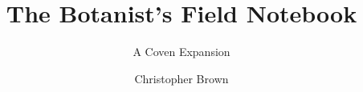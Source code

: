 \documentclass[a4paper,10pt,twocolumn]{memoir}
\title{The Botanist's Field Notebook}
\subtitle{A Coven Expansion}
\author{Christopher Brown}
\begin{document}
\frontmatter

\titlepage



\tableofcontents

\mainmatter



\backmatter

\printindex
\end{document}
